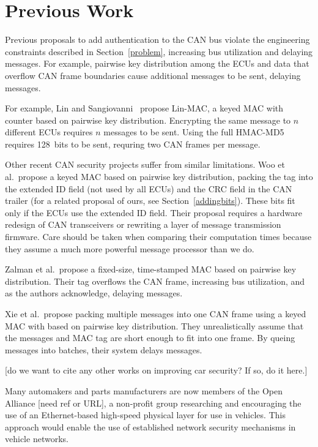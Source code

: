 \section{Previous Work}
\label{previous}

Previous proposals to add authentication to the CAN bus violate the engineering constraints described
in Section~\ref{problem}, increasing bus utilization and delaying messages.  For example, pairwise
key distribution among the ECUs and data that overflow CAN frame boundaries cause additional messages to be sent,
delaying messages.

For example, Lin and Sangiovanni~\cite{Lin-MAC} propose Lin-MAC, a keyed MAC with counter based on
pairwise key distribution.  Encrypting the same message to $n$ different ECUs requires $n$
messages to be sent.   Using the full HMAC-MD5 requires 128~bits to be sent, requring two CAN frames per message.

Other recent CAN security projects suffer from similar limitations. 
Woo et al.\ propose a keyed MAC based on pairwise key distribution,
packing the tag into the extended ID field (not used by all ECUs) and the CRC field in the CAN trailer
(for a related proposal of ours, see Section~\ref{addingbits}). 
These bits fit only if the ECUs use the extended ID field. 
Their proposal requires a hardware redesign of CAN transceivers or rewriting a layer of message transmission firmware.
Care should be taken when comparing their computation times because
they assume a much more powerful message processor than we do. 


Zalman et al.\ propose a fixed-size, time-stamped MAC based on pairwise key distribution.
Their tag overflows the CAN frame, increasing bus utilization, and as the authors acknowledge,
delaying messages.

Xie et al.\ propose packing multiple messages into one CAN frame using a keyed MAC with 
based on pairwise key distribution.   They unrealistically assume that the messages and MAC tag are short
enough to fit into one frame.  By queing messages into batches, their system delays messages.

[do we want to cite any other works on improving car security? If so, do it here.]

Many automakers and parts manufacturers are now members of the Open Alliance [need ref or URL], 
a non-profit group researching and encouraging the use of an Ethernet-based high-speed physical layer 
for use in vehicles.  This approach would enable the use of 
established network security mechanisms in vehicle networks.

